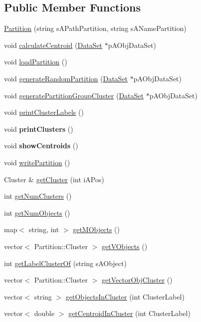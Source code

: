 \subsection*{Public Member Functions}
\begin{DoxyCompactItemize}
\item 
\hyperlink{classPartition_a9700c1c87842936c22fd9a3dc41740e1}{Partition} (string sAPathPartition, string sANamePartition)
\item 
void \hyperlink{classPartition_af9c0055c226e56ff0d02c935fc885b7b}{calculateCentroid} (\hyperlink{classDataSet}{DataSet} $\ast$pAObjDataSet)
\item 
void \hyperlink{classPartition_a025f8c250b2e7bb9d74ff18e6839105a}{loadPartition} ()
\item 
void \hyperlink{classPartition_a2c1bdfc1d754486482e9b0225c4eb184}{generateRandomPartition} (\hyperlink{classDataSet}{DataSet} $\ast$pAObjDataSet)
\item 
void \hyperlink{classPartition_a6e63e73de79cb57ef37261c15aedce47}{generatePartitionGroupCluster} (\hyperlink{classDataSet}{DataSet} $\ast$pAObjDataSet)
\item 
void \hyperlink{classPartition_a377ce02d44555898657ef992a1d4029a}{printClusterLabels} ()
\item 
\hypertarget{classPartition_a8c0c32cb03ce1268c65e0a0fc82520f2}{
void {\bfseries printClusters} ()}
\label{classPartition_a8c0c32cb03ce1268c65e0a0fc82520f2}

\item 
\hypertarget{classPartition_aa34ffcaa66ef17228be6fded9b9e69ac}{
void {\bfseries showCentroids} ()}
\label{classPartition_aa34ffcaa66ef17228be6fded9b9e69ac}

\item 
void \hyperlink{classPartition_a4204d0b43248fb2635607b8f87caff69}{writePartition} ()
\item 
Cluster \& \hyperlink{classPartition_ac2382e6bd161f3dc1f3cb6cc2d4a42f2}{getCluster} (int iAPos)
\item 
int \hyperlink{classPartition_ae78d06ba7708ffc35f93dfe166315c74}{getNumClusters} ()
\item 
int \hyperlink{classPartition_ae59c41688846ed426c0fba2338543440}{getNumObjects} ()
\item 
map$<$ string, int $>$ \hyperlink{classPartition_a4b2602b02fe2577c33b9f344a242cd32}{getMObjects} ()
\item 
vector$<$ Partition::Cluster $>$ \hyperlink{classPartition_a9d6584bb879af33206176d912d8394d0}{getVObjects} ()
\item 
int \hyperlink{classPartition_a5c0dc502d21ecd15279ace3e9cf05cb2}{getLabelClusterOf} (string sAObject)
\item 
vector$<$ Partition::Cluster $>$ \hyperlink{classPartition_a30c36aee050b5a222f70feae3a48ab07}{getVectorObjCluster} ()
\item 
vector$<$ string $>$ \hyperlink{classPartition_a2e226fe3b809239ceded7aa471339f2d}{getObjectsInCluster} (int ClusterLabel)
\item 
vector$<$ double $>$ \hyperlink{classPartition_ab2e66cdee06952b1d1417abedc1b86cc}{getCentroidInCluster} (int ClusterLabel)
\end{DoxyCompactItemize}


